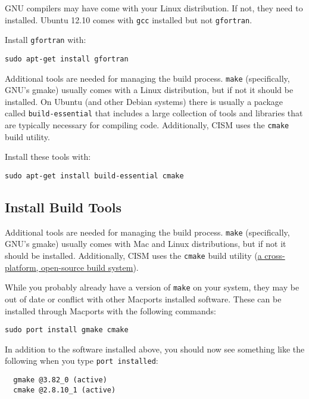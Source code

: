 \begin{mdframed}[style=ubuntu] %
GNU compilers may have come with your Linux distribution.  If not, they need to 
installed.  Ubuntu 12.10 comes with \texttt{gcc} installed but not \texttt{gfortran}.

Install \texttt{gfortran} with:

\texttt{sudo apt-get install gfortran}

Additional tools are needed for managing the build process.  \texttt{make} (specifically, GNU's gmake)
usually comes with a Linux distribution, but if not it should be installed.  On Ubuntu
(and other Debian systems) there is usually a package called \texttt{build-essential} that
includes a large collection of tools and libraries that are typically necessary
for compiling code.  Additionally, CISM uses the \texttt{cmake} build utility.

Install these tools with:

\texttt{sudo apt-get install build-essential cmake}

\end{mdframed}                 %


\subsection{Install Build Tools}

Additional tools are needed for managing the build process.  \texttt{make} (specifically, GNU's gmake)
usually comes with Mac and Linux distributions, but if not it should be installed.  
Additionally, CISM uses the \texttt{cmake} build utility 
(\href{http://www.cmake.org/}{a cross-platform, open-source build system}).

\begin{mdframed}[style=mac] %

While you probably already have a version of \texttt{make} on your system, they may be out of date or conflict with other Macports installed software. These can be installed through Macports with the following commands: 

\begin{verbatim}
sudo port install gmake cmake
\end{verbatim}

In addition to the software installed above, you should now see something like the following when you type \texttt{port installed}:

\begin{verbatim}
  gmake @3.82_0 (active)
  cmake @2.8.10_1 (active)
\end{verbatim}
\end{mdframed}              %



